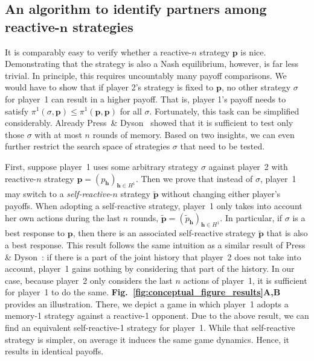 \documentclass[9pt,twocolumn,twoside]{pnas-new}
\newcommand{\figref}[1]{{\textbf{Fig.~\ref{#1}}}}
\begin{document}
\subsection*{An algorithm to identify partners among reactive-$\boldsymbol n$ strategies} 
It is comparably easy to verify whether a reactive-$n$ strategy $\mathbf{p}$ is nice. 
Demonstrating that the strategy is also a Nash equilibrium, however, is far less trivial. 
In principle, this requires uncountably many payoff comparisons. 
We would have to show that if player 2's strategy is fixed to $\mathbf{p}$, no other strategy $\sigma$ for player~1 can result in a higher payoff. That is, player 1's payoff needs to satisfy $\pi^1(\sigma,\mathbf{p})\!\le\!\pi^1(\mathbf{p},\mathbf{p})$ for all $\sigma$. 
Fortunately, this task can be simplified considerably. 
Already Press~\& Dyson~\cite{press:PNAS:2012} showed that it is sufficient to test only those $\sigma$ with at most $n$ rounds of memory. 
Based on two insights, we can even further restrict the search space of strategies $\sigma$ that need to be tested.

First, suppose player~1 uses some arbitrary strategy $\sigma$ against player~2 with reactive-$n$ strategy \mbox{$\mathbf{p}\!=\!(p_\mathbf{h})_{\mathbf{h}\in H^1}$}. 
Then we prove that instead of $\sigma$, player~1 may switch to a {\it self-reactive}-$n$ strategy $\mathbf{\tilde{p}}$ without changing either player's payoffs. 
When adopting a self-reactive strategy, player~1 only takes into account her own actions during the last $n$ rounds, 
$\mathbf{\tilde{p}} \!=\! (\tilde{p}_\mathbf{h})_{\mathbf{h} \in H^1}$.
In particular, if $\sigma$ is a best response to $\mathbf{p}$, then there is an associated self-reactive strategy $\mathbf{\tilde p}$ that is also a best response. 
This result follows the same intuition as a similar result of Press \& Dyson~\cite{press:PNAS:2012}: 
if there is a part of the joint history that player~2 does not take into account, player~1 gains nothing by considering that part of the history. 
In our case, because player~2 only considers the last $n$ actions of player~1, it is sufficient for player~1 to do the same.
\figref{fig:conceptual_figure_results}\textbf{A,B} provides an illustration.  
There, we depict a game in which player~1 adopts a memory-1 strategy against a reactive-1 opponent. 
Due to the above result, we can find an equivalent self-reactive-1 strategy for player~1. 
While that self-reactive strategy is simpler, on average it induces the same game dynamics. 
Hence, it results in identical payoffs. 
\end{document}
